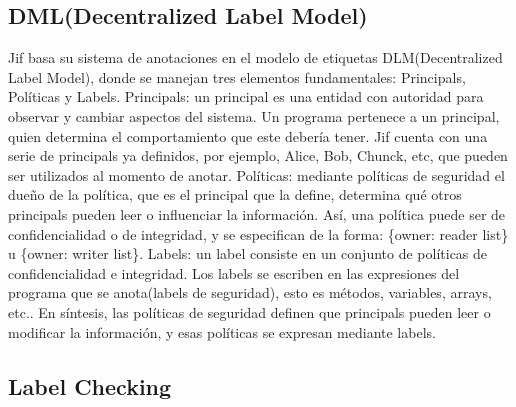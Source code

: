 \subsection{DML(Decentralized Label Model)}
Jif basa su sistema de anotaciones en el modelo de etiquetas DLM(Decentralized
Label Model), donde se manejan tres elementos fundamentales: Principals,
Políticas y Labels.\newline
Principals: un principal es una entidad con autoridad para observar y cambiar
aspectos del sistema. Un programa pertenece a un principal, quien determina el
comportamiento que este debería tener. Jif cuenta con una serie de principals ya
definidos, por ejemplo, Alice, Bob, Chunck, etc, que pueden ser
utilizados al momento de anotar.\newline 
Políticas: mediante políticas de seguridad el dueño de la política, que es el
principal que la define, determina qué otros principals pueden leer o
influenciar la información. Así, una política puede ser de confidencialidad o de
integridad, y se especifican de la forma: \{owner: reader list\} u
\{owner: writer list\}.\newline 
Labels: un label consiste en un conjunto de políticas de confidencialidad e
integridad. Los labels se escriben en las expresiones del programa que se
anota(labels de seguridad), esto es métodos, variables, arrays, etc..\newline 
En síntesis, las políticas de seguridad definen que principals pueden leer o
modificar la información, y esas políticas se expresan mediante labels.

\subsection{Label Checking}
\label{subsec: pc}

